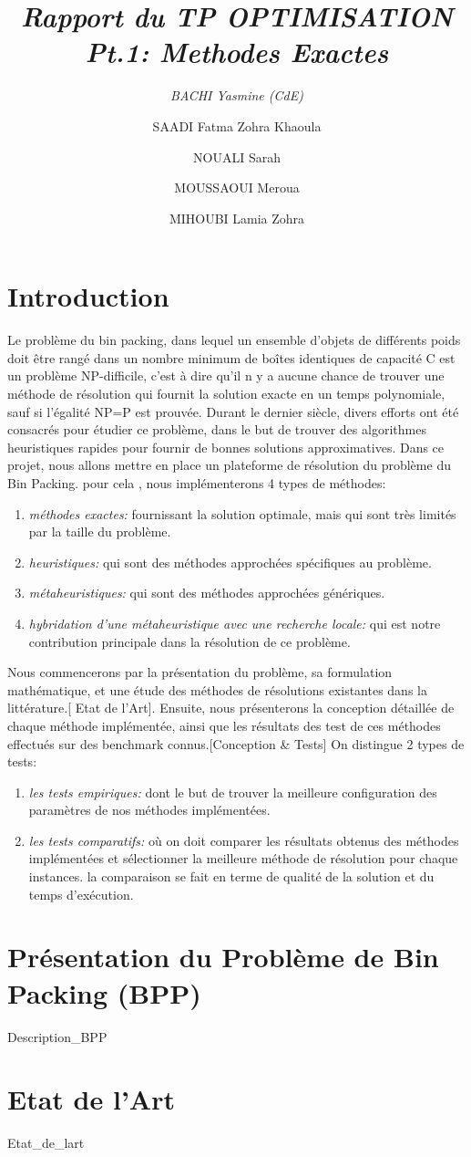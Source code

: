 \documentclass[12pt,a4paper, titlepage]{report}
\title{\emph{Rapport du TP OPTIMISATION Pt.1: Methodes Exactes} }
\author{ 
    \emph{BACHI Yasmine (CdE)}
    \and
    SAADI Fatma Zohra Khaoula
    \and 
    NOUALI Sarah
    \and 
    MOUSSAOUI Meroua
    \and 
    MIHOUBI Lamia Zohra}
\begin{document}
    \maketitle
    \tableofcontents
    \chapter*{Introduction}
      
    Le problème du bin packing, dans lequel un ensemble d’objets de différents poids doit être rangé dans un nombre minimum de boîtes identiques de capacité C est un problème NP-difficile, c’est à dire qu’il n y a aucune chance de trouver une méthode de résolution qui fournit la solution exacte en un temps polynomiale, sauf si l’égalité NP=P est prouvée. 
    Durant le dernier siècle, divers efforts ont été consacrés pour étudier ce problème, dans le but de trouver des algorithmes heuristiques rapides pour fournir de bonnes solutions approximatives.
    Dans ce projet, nous allons mettre en place un plateforme de résolution du problème du Bin Packing. pour cela , nous implémenterons 4 types de méthodes: 
    \begin{enumerate}
        \item \emph{méthodes exactes:} fournissant la solution optimale, mais qui sont très limités par la taille du problème. 
        \item \emph{heuristiques:} qui sont des méthodes approchées spécifiques au problème.
        \item \emph{métaheuristiques:} qui sont des méthodes approchées génériques.
        \item \emph{hybridation d'une métaheuristique avec une recherche locale:} qui est notre contribution principale dans la résolution de ce problème.
    \end{enumerate}
    Nous commencerons par la présentation du problème, sa formulation mathématique, et une étude des méthodes de résolutions existantes dans la littérature.[ Etat de l’Art]. Ensuite, nous présenterons la conception détaillée de chaque méthode implémentée, ainsi que les résultats des test de ces méthodes effectués sur des benchmark connus.[Conception \& Tests]
    On distingue 2 types de tests:
    \begin{enumerate}
        \item \emph{les tests empiriques:} dont le but de trouver la meilleure configuration des paramètres de nos méthodes implémentées.  
        \item \emph{les tests comparatifs:} où on doit comparer les résultats obtenus des méthodes implémentées et sélectionner la meilleure méthode de résolution pour chaque instances. la comparaison se fait en terme de qualité de la solution et du temps d'exécution. 
    \end{enumerate}
    \chapter{Présentation du Problème de Bin Packing (BPP)}
    {Description_BPP}
    \chapter{Etat de l'Art}
    {Etat_de_lart}
\end{document}
